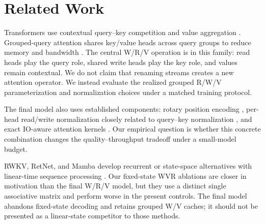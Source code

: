 \section{Related Work}

Transformers use contextual query--key competition and value aggregation \citep{vaswani2017attention}. Grouped-query attention shares key/value heads across query groups to reduce memory and bandwidth \citep{ainslie2023gqa}. The central W/R/V operation is in this family: read heads play the query role, shared write heads play the key role, and values remain contextual. We do not claim that renaming streams creates a new attention operator. We instead evaluate the realized grouped R/W/V parameterization and normalization choices under a matched training protocol.

The final model also uses established components: rotary position encoding \citep{su2021roformer}, per-head read/write normalization closely related to query--key normalization \citep{henry2020qknorm}, and exact IO-aware attention kernels \citep{dao2022flashattention}. Our empirical question is whether this concrete combination changes the quality--throughput tradeoff under a small-model budget.

RWKV, RetNet, and Mamba develop recurrent or state-space alternatives with linear-time sequence processing \citep{peng2023rwkv,sun2023retnet,gu2023mamba}. Our fixed-state WVR ablations are closer in motivation than the final W/R/V model, but they use a distinct single associative matrix and perform worse in the present controls. The final model abandons fixed-state decoding and retains grouped W/V caches; it should not be presented as a linear-state competitor to those methods.
